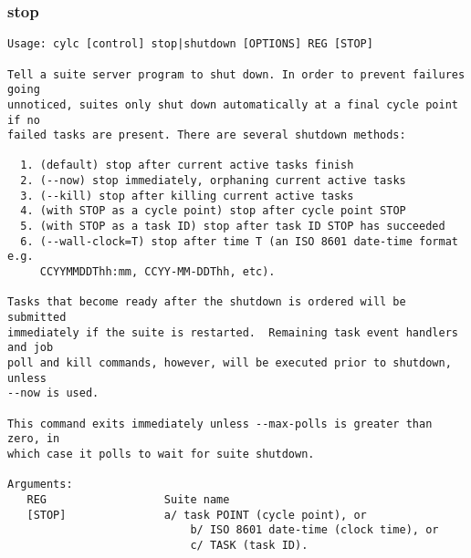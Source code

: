 \subsubsection{stop}
\label{stop}
\begin{lstlisting}
Usage: cylc [control] stop|shutdown [OPTIONS] REG [STOP] 

Tell a suite server program to shut down. In order to prevent failures going
unnoticed, suites only shut down automatically at a final cycle point if no
failed tasks are present. There are several shutdown methods:

  1. (default) stop after current active tasks finish
  2. (--now) stop immediately, orphaning current active tasks
  3. (--kill) stop after killing current active tasks
  4. (with STOP as a cycle point) stop after cycle point STOP
  5. (with STOP as a task ID) stop after task ID STOP has succeeded
  6. (--wall-clock=T) stop after time T (an ISO 8601 date-time format e.g.
     CCYYMMDDThh:mm, CCYY-MM-DDThh, etc).

Tasks that become ready after the shutdown is ordered will be submitted
immediately if the suite is restarted.  Remaining task event handlers and job
poll and kill commands, however, will be executed prior to shutdown, unless
--now is used.

This command exits immediately unless --max-polls is greater than zero, in
which case it polls to wait for suite shutdown.

Arguments:
   REG                  Suite name
   [STOP]               a/ task POINT (cycle point), or
                            b/ ISO 8601 date-time (clock time), or
                            c/ TASK (task ID).


\end{lstlisting}
